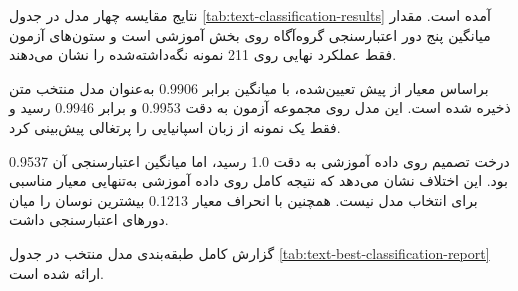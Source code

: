 نتایج مقایسه چهار مدل در جدول
\ref{tab:text-classification-results}
آمده است. مقدار
میانگین پنج دور اعتبارسنجی گروه‌آگاه روی بخش آموزشی است و ستون‌های آزمون فقط عملکرد نهایی روی 211 نمونه نگه‌داشته‌شده را نشان می‌دهند.

\begin{table}[H]
\centering
\caption{مقایسه نتایج طبقه‌بندی متن}
\label{tab:text-classification-results}
\small
{}
\end{table}

براساس معیار از پیش تعیین‌شده،
با میانگین
برابر 0.9906 به‌عنوان مدل منتخب متن ذخیره شده است. این مدل روی مجموعه آزمون به دقت 0.9953 و
برابر 0.9946 رسید و فقط یک نمونه از زبان اسپانیایی را پرتغالی پیش‌بینی کرد.

درخت تصمیم روی داده آموزشی به دقت 1.0 رسید، اما میانگین
اعتبارسنجی آن 0.9537 بود. این اختلاف نشان می‌دهد که نتیجه کامل روی داده آموزشی به‌تنهایی معیار مناسبی برای انتخاب مدل نیست. همچنین
با انحراف معیار 0.1213 بیشترین نوسان را میان دورهای اعتبارسنجی داشت.

گزارش کامل طبقه‌بندی مدل منتخب در جدول
\ref{tab:text-best-classification-report}
ارائه شده است.

